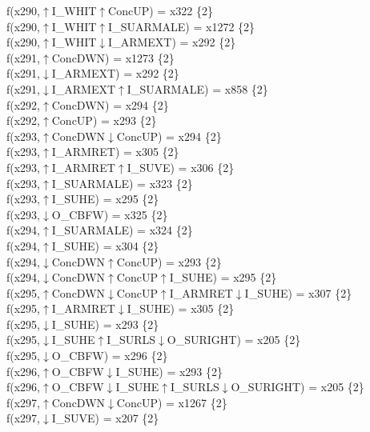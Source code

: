 f(x290,$\uparrow$I\_WHIT$\uparrow$ConcUP) = x322 \{2\} \\  
f(x290,$\uparrow$I\_WHIT$\uparrow$I\_SUARMALE) = x1272 \{2\} \\  
f(x290,$\uparrow$I\_WHIT$\downarrow$I\_ARMEXT) = x292 \{2\} \\  
f(x291,$\uparrow$ConcDWN) = x1273 \{2\} \\  
f(x291,$\downarrow$I\_ARMEXT) = x292 \{2\} \\  
f(x291,$\downarrow$I\_ARMEXT$\uparrow$I\_SUARMALE) = x858 \{2\} \\  
f(x292,$\uparrow$ConcDWN) = x294 \{2\} \\  
f(x292,$\uparrow$ConcUP) = x293 \{2\} \\  
f(x293,$\uparrow$ConcDWN$\downarrow$ConcUP) = x294 \{2\} \\  
f(x293,$\uparrow$I\_ARMRET) = x305 \{2\} \\  
f(x293,$\uparrow$I\_ARMRET$\uparrow$I\_SUVE) = x306 \{2\} \\  
f(x293,$\uparrow$I\_SUARMALE) = x323 \{2\} \\  
f(x293,$\uparrow$I\_SUHE) = x295 \{2\} \\  
f(x293,$\downarrow$O\_CBFW) = x325 \{2\} \\  
f(x294,$\uparrow$I\_SUARMALE) = x324 \{2\} \\  
f(x294,$\uparrow$I\_SUHE) = x304 \{2\} \\  
f(x294,$\downarrow$ConcDWN$\uparrow$ConcUP) = x293 \{2\} \\  
f(x294,$\downarrow$ConcDWN$\uparrow$ConcUP$\uparrow$I\_SUHE) = x295 \{2\} \\  
f(x295,$\uparrow$ConcDWN$\downarrow$ConcUP$\uparrow$I\_ARMRET$\downarrow$I\_SUHE) = x307 \{2\} \\  
f(x295,$\uparrow$I\_ARMRET$\downarrow$I\_SUHE) = x305 \{2\} \\  
f(x295,$\downarrow$I\_SUHE) = x293 \{2\} \\  
f(x295,$\downarrow$I\_SUHE$\uparrow$I\_SURLS$\downarrow$O\_SURIGHT) = x205 \{2\} \\  
f(x295,$\downarrow$O\_CBFW) = x296 \{2\} \\  
f(x296,$\uparrow$O\_CBFW$\downarrow$I\_SUHE) = x293 \{2\} \\  
f(x296,$\uparrow$O\_CBFW$\downarrow$I\_SUHE$\uparrow$I\_SURLS$\downarrow$O\_SURIGHT) = x205 \{2\} \\  
f(x297,$\uparrow$ConcDWN$\downarrow$ConcUP) = x1267 \{2\} \\  
f(x297,$\downarrow$I\_SUVE) = x207 \{2\} \\  
